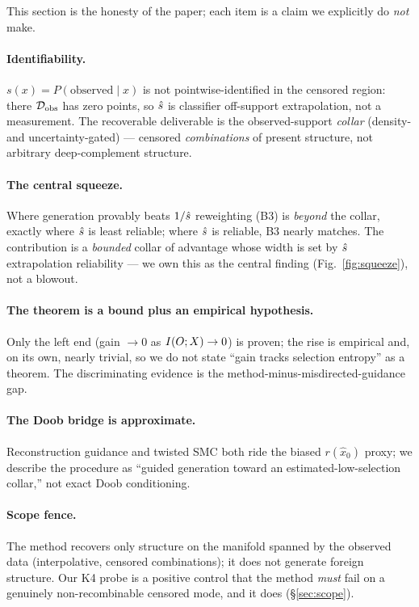 This section is the honesty of the paper; each item is a claim we explicitly do
\emph{not} make.

\paragraph{Identifiability.} $s(x)=P(\text{observed}\mid x)$ is not
pointwise-identified in the censored region: there $\mathcal{D}_{\mathrm{obs}}$ has zero points, so
$\hat s$ is classifier off-support extrapolation, not a measurement. The
recoverable deliverable is the observed-support \emph{collar} (density- and
uncertainty-gated) --- censored \emph{combinations} of present structure, not
arbitrary deep-complement structure.

\paragraph{The central squeeze.} Where generation provably beats $1/\hat s$
reweighting (B3) is \emph{beyond} the collar, exactly where $\hat s$ is least
reliable; where $\hat s$ is reliable, B3 nearly matches. The contribution is a
\emph{bounded} collar of advantage whose width is set by $\hat s$ extrapolation
reliability --- we own this as the central finding (Fig.~\ref{fig:squeeze}), not
a blowout.

\paragraph{The theorem is a bound plus an empirical hypothesis.} Only the left
end (gain $\to 0$ as $I(O;X)\to 0$) is proven; the rise is empirical and, on its
own, nearly trivial, so we do not state ``gain tracks selection entropy'' as a
theorem. The discriminating evidence is the method-minus-misdirected-guidance
gap.

\paragraph{The Doob bridge is approximate.} Reconstruction guidance and twisted
SMC both ride the biased $r(\hat x_0)$ proxy; we describe the procedure as
``guided generation toward an estimated-low-selection collar,'' not exact Doob
conditioning.

\paragraph{Scope fence.} The method recovers only structure on the manifold
spanned by the observed data (interpolative, censored combinations); it does not
generate foreign structure. Our K4 probe is a positive control that the method
\emph{must} fail on a genuinely non-recombinable censored mode, and it does
(\S\ref{sec:scope}).

